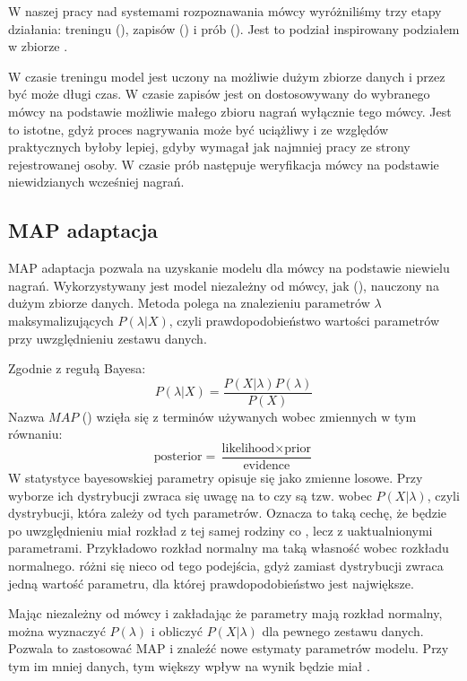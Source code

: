 W naszej pracy nad systemami rozpoznawania mówcy wyróżniliśmy trzy etapy działania: treningu (),
zapisów () i prób (). Jest to podział inspirowany podziałem w zbiorze .

W czasie treningu model jest uczony na możliwie dużym zbiorze danych i przez być może długi czas. W czasie zapisów
jest on dostosowywany do wybranego mówcy na podstawie możliwie małego zbioru nagrań wyłącznie tego mówcy. Jest
to istotne, gdyż proces nagrywania może być uciążliwy i ze względów praktycznych byłoby lepiej, gdyby wymagał
jak najmniej pracy ze strony rejestrowanej osoby. W czasie prób następuje weryfikacja mówcy na podstawie niewidzianych
wcześniej nagrań.

\subsection{MAP adaptacja}

MAP adaptacja pozwala na uzyskanie modelu dla mówcy na podstawie niewielu nagrań. Wykorzystywany jest model niezależny
od mówcy, jak  (), nauczony na dużym zbiorze danych.
Metoda polega na znalezieniu parametrów $\lambda$
maksymalizujących $P(\lambda | X)$, czyli prawdopodobieństwo wartości parametrów przy uwzględnieniu zestawu danych.

Zgodnie z regułą Bayesa:
$$P(\lambda | X) = \frac{P(X | \lambda) P(\lambda)}{P(X)}$$
Nazwa $MAP$ () wzięła się z terminów używanych wobec zmiennych w tym równaniu:
$$\text{posterior} = \frac{\text{likelihood} \times \text{prior}}{\text{evidence}}$$
W statystyce bayesowskiej parametry opisuje się jako zmienne losowe. Przy wyborze ich dystrybucji zwraca się uwagę
na to czy są tzw.  wobec $P(X | \lambda)$, czyli dystrybucji, która zależy od tych parametrów.
Oznacza to taką cechę, że  będzie po uwzględnieniu  miał rozkład z tej samej
rodziny co , lecz z uaktualnionymi parametrami. Przykładowo rozkład normalny ma taką własność wobec
rozkładu normalnego.   różni się nieco od tego podejścia, gdyż zamiast dystrybucji zwraca jedną
wartość parametru, dla której prawdopodobieństwo jest największe.

Mając  niezależny od mówcy i zakładając że parametry mają rozkład normalny, można wyznaczyć
$P(\lambda)$ i obliczyć $P(X | \lambda)$ dla pewnego zestawu danych. Pozwala to zastosować MAP i znaleźć nowe
estymaty parametrów modelu. Przy tym im mniej danych, tym większy wpływ na wynik będzie miał .

